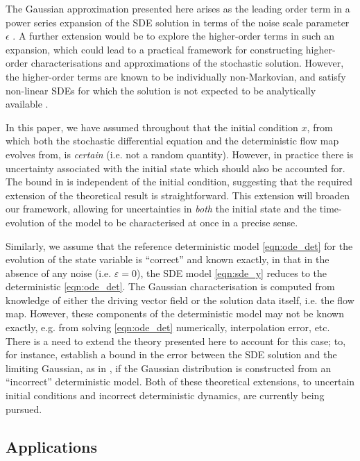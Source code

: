 The Gaussian approximation presented here arises as the leading order term in a power series expansion of the SDE solution in terms of the noise scale parameter \(\epsilon\) \cite{Blagoveshchenskii_1962_DiffusionProcessesDepending}.
A further extension would be to explore the higher-order terms in such an expansion, which could lead to a practical framework for constructing higher-order characterisations and approximations of the stochastic solution.
However, the higher-order terms are known to be individually non-Markovian, and satisfy non-linear SDEs for which the solution is not expected to be analytically available \cite{Blagoveshchenskii_1962_DiffusionProcessesDepending}.

In this paper, we have assumed throughout that the initial condition \(x\), from which both the stochastic differential equation and the deterministic flow map evolves from, is \emph{certain} (i.e. not a random quantity).
However, in practice there is uncertainty associated with the initial state which should also be accounted for.
The bound in  is independent of the initial condition, suggesting that the required extension of the theoretical result is straightforward.
This extension will broaden our framework, allowing for uncertainties in \emph{both} the initial state and the time-evolution of the model to be characterised at once in a precise sense.

Similarly, we assume that the reference deterministic model \eqref{eqn:ode_det} for the evolution of the state variable is ``correct'' and known exactly, in that in the absence of any noise (i.e. \(\varepsilon = 0\)), the SDE model \eqref{eqn:sde_y} reduces to the deterministic \eqref{eqn:ode_det}. 
The Gaussian characterisation is computed from knowledge of either the driving vector field or the solution data itself, i.e. the flow map.
However, these components of the deterministic model may not be known exactly, e.g. from solving \eqref{eqn:ode_det} numerically, interpolation error, etc.
There is a need to extend the theory presented here to account for this case; to, for instance, establish a bound in the error between the SDE solution and the limiting Gaussian, as in , if the Gaussian distribution is constructed from an ``incorrect'' deterministic model.
Both of these theoretical extensions, to uncertain initial conditions and incorrect deterministic dynamics, are currently being pursued.


\subsection{Applications}

